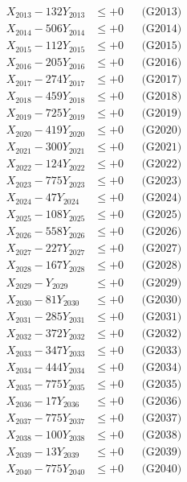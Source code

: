 \documentclass[a4paper,10pt]{article}
\begin{document}
{\begin{align}
X_{2013} - 132Y_{2013} &\leq +0 && \text{(G2013)} \\
X_{2014} - 506Y_{2014} &\leq +0 && \text{(G2014)} \\
X_{2015} - 112Y_{2015} &\leq +0 && \text{(G2015)} \\
X_{2016} - 205Y_{2016} &\leq +0 && \text{(G2016)} \\
X_{2017} - 274Y_{2017} &\leq +0 && \text{(G2017)} \\
X_{2018} - 459Y_{2018} &\leq +0 && \text{(G2018)} \\
X_{2019} - 725Y_{2019} &\leq +0 && \text{(G2019)} \\
X_{2020} - 419Y_{2020} &\leq +0 && \text{(G2020)} \\
\allowbreak
X_{2021} - 300Y_{2021} &\leq +0 && \text{(G2021)} \\
X_{2022} - 124Y_{2022} &\leq +0 && \text{(G2022)} \\
X_{2023} - 775Y_{2023} &\leq +0 && \text{(G2023)} \\
X_{2024} - 47Y_{2024} &\leq +0 && \text{(G2024)} \\
X_{2025} - 108Y_{2025} &\leq +0 && \text{(G2025)} \\
X_{2026} - 558Y_{2026} &\leq +0 && \text{(G2026)} \\
X_{2027} - 227Y_{2027} &\leq +0 && \text{(G2027)} \\
X_{2028} - 167Y_{2028} &\leq +0 && \text{(G2028)} \\
X_{2029} - Y_{2029} &\leq +0 && \text{(G2029)} \\
X_{2030} - 81Y_{2030} &\leq +0 && \text{(G2030)} \\
\allowbreak
X_{2031} - 285Y_{2031} &\leq +0 && \text{(G2031)} \\
X_{2032} - 372Y_{2032} &\leq +0 && \text{(G2032)} \\
X_{2033} - 347Y_{2033} &\leq +0 && \text{(G2033)} \\
X_{2034} - 444Y_{2034} &\leq +0 && \text{(G2034)} \\
X_{2035} - 775Y_{2035} &\leq +0 && \text{(G2035)} \\
X_{2036} - 17Y_{2036} &\leq +0 && \text{(G2036)} \\
X_{2037} - 775Y_{2037} &\leq +0 && \text{(G2037)} \\
X_{2038} - 100Y_{2038} &\leq +0 && \text{(G2038)} \\
X_{2039} - 13Y_{2039} &\leq +0 && \text{(G2039)} \\
X_{2040} - 775Y_{2040} &\leq +0 && \text{(G2040)} \\

\end{align}}
\end{document}
